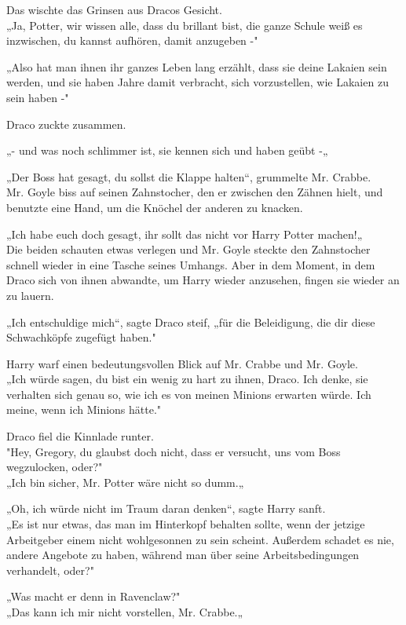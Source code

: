 {Das wischte das Grinsen aus Dracos Gesicht.\\ „Ja, Potter, wir wissen alle, dass du brillant bist, die ganze Schule weiß es inzwischen, du kannst aufhören, damit anzugeben -"

„Also hat man ihnen ihr ganzes Leben lang erzählt, dass sie deine Lakaien sein werden, und sie haben Jahre damit verbracht, sich vorzustellen, wie Lakaien zu sein haben -"

Draco zuckte zusammen.

„- und was noch schlimmer ist, sie kennen sich und haben geübt -„

„Der Boss hat gesagt, du sollst die Klappe halten“, grummelte Mr. Crabbe.\\ Mr. Goyle biss auf seinen Zahnstocher, den er zwischen den Zähnen hielt, und benutzte eine Hand, um die Knöchel der anderen zu knacken.

„Ich habe euch doch gesagt, ihr sollt das nicht vor Harry Potter machen!„\\ Die beiden schauten etwas verlegen und Mr. Goyle steckte den Zahnstocher schnell wieder in eine Tasche seines Umhangs. Aber in dem Moment, in dem Draco sich von ihnen abwandte, um Harry wieder anzusehen, fingen sie wieder an zu lauern.

„Ich entschuldige mich“, sagte Draco steif, „für die Beleidigung, die dir diese Schwachköpfe zugefügt haben."

Harry warf einen bedeutungsvollen Blick auf Mr. Crabbe und Mr. Goyle.\\ „Ich würde sagen, du bist ein wenig zu hart zu ihnen, Draco. Ich denke, sie verhalten sich genau so, wie ich es von meinen Minions erwarten würde. Ich meine, wenn ich Minions hätte."

Draco fiel die Kinnlade runter.\\ "Hey, Gregory, du glaubst doch nicht, dass er versucht, uns vom Boss wegzulocken, oder?"\\ „Ich bin sicher, Mr. Potter wäre nicht so dumm.„

„Oh, ich würde nicht im Traum daran denken“, sagte Harry sanft.\\ „Es ist nur etwas, das man im Hinterkopf behalten sollte, wenn der jetzige Arbeitgeber einem nicht wohlgesonnen zu sein scheint. Außerdem schadet es nie, andere Angebote zu haben, während man über seine Arbeitsbedingungen verhandelt, oder?"

„Was macht er denn in Ravenclaw?"\\ „Das kann ich mir nicht vorstellen, Mr. Crabbe.„

}
